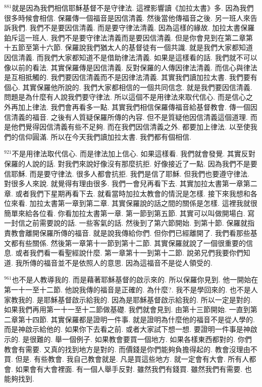\documentclass{book}
\begin{document}
$^{881}$就是因為我們相信耶穌基督不是守律法.
這裡影響讀《加拉太書》多.
因為我們很多時候會相信.
保羅傳一個福音是因信清義.
然後當他傳福音之後.
另一班人來告訴我們.
我們不是要因信清義.
而是要守律法清義.
因為這樣的緣故.
加拉太書保羅鉑斥這一班人.
我們不是要守律法清義而是要因信清義.
但是你會見到在第二章第十五節至第十六節.
保羅說我們猶太人的基督徒有一個共識.
就是我們大家都知道因信清義.
而我們大家都知道不是借助律法清義.
如果是這樣看的話.
我們就不可以像以前的看法.
其實保羅傳是因信清義.
反對保羅的人傳因律法清義.
而信心與律法是互相抵觸的.
我們要因信清義而不是因律法清義.
其實我們讀加拉太書.
我們要有個心.
其實保羅他所說的.
我們大家都相信的一個共同信念.
就是我們要因信清義.
問題是為什麼有人說我們要守律法.
所以這個不是用律法來取代信心.
而是信心之外再加上律法.
我們會再看多一點.
其實我們相信保羅傳福音給基督教會.
傳一個因信清義的福音.
之後有人質疑保羅所傳的內容.
但不是質疑他因信清義這個道理.
而是他們覺得因信清義有些不足夠.
而在我們因信清義之外.
都要加上律法.
以至使我們的信仰圓滿.
所以在今天我們讀加拉太書.
我們都有個相信.

$^{921}$不是用律法取代信心.
而是律法加上信心.
如果這樣看.
我們就會發覺.
其實反對保羅的人說的話.
對我們來說好像沒有那麼抗拒.
好像接近了一點.
因為我們不是要信耶穌.
而是要守律法.
很多人都會抗拒.
我們是信了耶穌.
但我們也要遵守律法.
對很多人來說.
就覺得有理由很多.
我們一會兒再看下去.
其實加拉太書第一章第二章.
或者我們下星期再看下去.
就看當時加拉太教會的情況是怎樣.
接下來我想和各位來看.
加拉太書第一章到第二章.
其實保羅說的話之間的關係是怎樣.
這裡我就很簡單來給各位看.
你看加拉太書第一章.
第一節到第五節.
其實可以叫做開場白.
寫一封信之前需要說的話.
一些客氣的話.
然後到了第六節開始.
到第十節.
保羅就指責教會離開保羅所傳的福音.
就是說我傳給你們.
但你們已經離開了.
我們看那些基文都有些關係.
然後第一章第十一節到第十二節.
其實保羅就說了一個很重要的信息.
或者我們看一看聖經說什麼.
第一章第十一到第十二節.
說弟兄們我要你們知道.
我所傳的福音並不是依照人的意思.
因為這福音不是從人領受的.

$^{961}$也不是人教導我的.
而是藉著耶穌基督的啟示來的.
所以保羅你見到.
他一開始在第一十一至十二節.
他說我傳的福音是正確的.
為什麼?.
我不是學回來的.
也不是人家教我的.
是耶穌基督啟示給我的.
因為是耶穌基督啟示給我的.
所以一定是對的.
如果我們再用第一十一至十二節做基礎.
我們就會見到.
由第十三節開始.
一直到第二章第十四節.
其實保羅都是證明一件事.
就是證明為什麼他的福音不是從人學的.
而是神啟示給他的.
如果你下去看之前.
或者大家試下想一想.
要證明一件事是神啟示的.
是很難的.
舉一個例子.
如果教會要買一個地方.
如果各樣東西都對的.
你們教會有需要.
又真的找到地方是對的.
而價錢是你們能夠負擔得起的.
教會沒理由不買.
但是.
有些教會.
我自己教會就是.
凡是買這些地方.
就一定會有大會.
所有人都會.
如果會有大會裡面.
有一個人舉手反對.
雖然我們有錢買.
雖然我們有需要.
也能夠找到.
\end{document}
